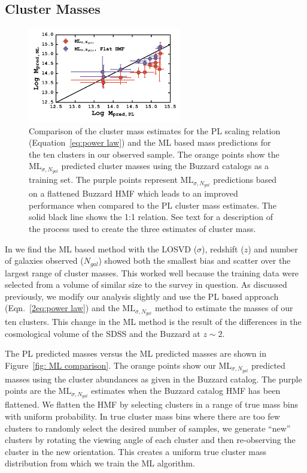 \subsection{Cluster Masses}
\begin{figure}[t] 
	\begin{center}
		\includegraphics[width=0.6\textwidth]{figures2/massCompare.pdf} 
	\end{center}
	\caption[PL estimated cluster versus ML predicted cluster mass]{Comparison of the cluster mass estimates for the PL scaling relation (Equation~\ref{eq:power law}) and the ML based mass predictions for the ten clusters in our observed sample. The orange points show the $\mathrm{ML}_{\sigma, N_{gal}}$ predicted cluster masses using the Buzzard catalogs as a training set. The purple points represent $\mathrm{ML}_{\sigma, N_{gal}}$ predictions based on a flattened Buzzard HMF which leads to an improved performance when compared to the PL cluster mass estimates. The solid black line shows the 1:1 relation. See text for a description of the process used to create the three estimates of cluster mass.}
 \label{2fig: ML comparison} 
\end{figure}

In  we find the ML based method with the LOSVD ($\sigma$), redshift ($z$) and number of galaxies observed ($N_{gal}$) showed both the smallest bias and scatter over the largest range of cluster masses. This worked well because the training data were selected from a volume of similar size to the survey in question. As discussed previously, we modify our analysis slightly and use the PL based approach (Eqn.~\ref{2eq:power law}) and the $\mathrm{ML}_{\sigma, N_{gal}}$ method to estimate the masses of our ten clusters. This change in the ML method is the result of the differences in the cosmological volume of the SDSS and the Buzzard at $z\sim2$.  

The PL predicted masses versus the ML predicted masses are shown in Figure~\ref{fig: ML comparison}. The orange points show our $\mathrm{ML}_{\sigma, N_{gal}}$ predicted masses using the cluster abundances as given in the Buzzard catalog. The purple points are the $\mathrm{ML}_{\sigma, N_{gal}}$ estimates when the Buzzard catalog HMF has been flattened. We flatten the HMF by selecting clusters in a range of true mass bins with uniform probability. In true cluster mass bins where there are too few clusters to randomly select the desired number of samples, we generate ``new'' clusters by rotating the viewing angle of each cluster and then re-observing the cluster in the new orientation. This creates a uniform true cluster mass distribution from which we train the ML algorithm. 


